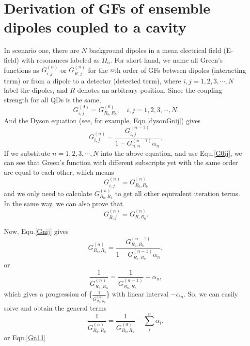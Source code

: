 \chapter[GFs for Ensemble Coupled to a Cavity]{Derivation of GFs of ensemble dipoles coupled to a cavity}\label{App:GF_ensemble}

In scenario one, there are $N$ background dipoles in a mean electrical field (E-field) with resonances labeled as $\Omega_n$. For short hand, we name all Green's functions as $G^{(n)}_{i,j}$ or $G^{(n)}_{R,j}$ for the $n$th order of GFs between dipoles (interacting term) or from a dipole to a detector (detected term), where $i,j=1,2,3,\cdots,N$ label the dipoles, and $R$ denotes an arbitrary position. Since the coupling strength for all QDs is the same,
\begin{equation}
\label{G0ij}
 G^{(0)}_{i,j}=G^{(0)}_{R_b,R_b},\quad i,j=1,2,3,\cdots,N.
\end{equation}
And the Dyson equation (see, for example, Equ.\eqref{dysonGnij}) gives
\begin{equation}
\label{Gnij}
 G^{(n)}_{i,j}=\frac{G^{(n-1)}_{i,j}}{1-G^{(n-1)}_{n,n}\alpha_n},
\end{equation}
If we substitute $n=1,2,3,\cdots,N$ into the above equation, and use Equ.\eqref{G0ij}, we can see that Green's function with different subscripts yet with the same order are equal to each other, which means
\begin{equation}
\label{Gnij11}
 G^{(n)}_{i,j}=G^{(n)}_{R_b,R_b}
\end{equation}
 and we only need to calculate $G^{(n)}_{R_b,R_b}$ to get all other equivalent iteration terms. In the same way, we can also prove that
\begin{equation}
\label{GnRjR1}
 G^{(n)}_{R,j}=G^{(n)}_{R,R_b}.
\end{equation}

Now, Equ.\eqref{Gnij} gives
\begin{equation}
 G^{(n)}_{R_b,R_b}=\frac{G^{(n-1)}_{R_b,R_b}}{1-G^{(n-1)}_{R_b,R_b}\alpha_n},
\end{equation}
or
\begin{equation}
\label{revGn11}
 \frac{1}{G^{(n)}_{R_b,R_b}}=\frac{1}{G^{(n-1)}_{R_b,R_b}}-\alpha_n,
\end{equation}
which gives a progression of \{$\frac{1}{G^{(n)}_{R_b,R_b}}$\} with linear interval $-\alpha_n$. So, we can easily solve and obtain the general terms
\begin{equation}
 \frac{1}{G^{(n)}_{R_b,R_b}}=\frac{1}{G^{(0)}_{R_b,R_b}}-\sum_i^n{\alpha_i},
\end{equation}
or Equ.\eqref{Gn11}

